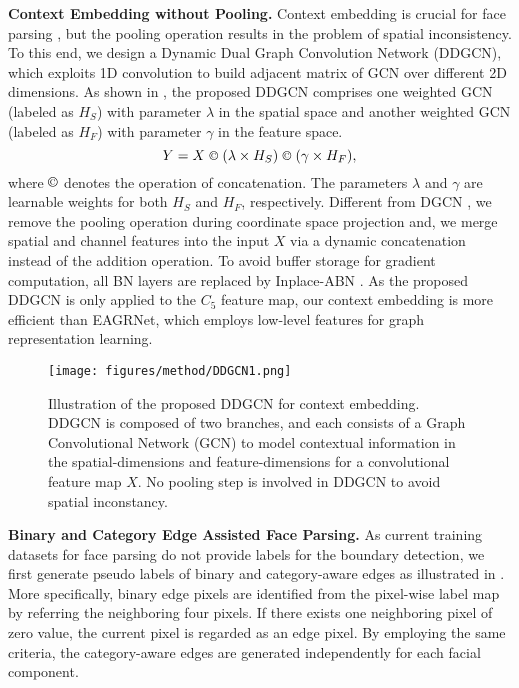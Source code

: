 \documentclass[10pt,twocolumn,letterpaper]{article}
\begin{document}
\noindent\textbf{Context Embedding without Pooling.} 
Context embedding is crucial for face parsing \cite{psp, NonLocal2018, dilatedConv1, YuKoltun2016}, but the pooling operation results in the problem of spatial inconsistency. To this end, we design a Dynamic Dual Graph Convolution Network (DDGCN), which exploits 1D convolution to build adjacent matrix of GCN over different 2D dimensions. As shown in \figureautorefname{ \ref{fig:ddgcn}}, the proposed DDGCN comprises one weighted GCN (labeled as $H_{S}$) with parameter $\lambda$ in the spatial space and another weighted GCN (labeled as $H_{F}$) with parameter $\gamma$ in the feature space. 
\begin{equation}
\small
Y = X \ \copyright \ (\lambda \times H_{S}) \ \copyright \ (\gamma \times H_{F}),
\end{equation}
where $\copyright$ denotes the operation of concatenation. The parameters $\lambda$ and $\gamma$ are learnable weights for both $H_{S}$ and $H_{F}$, respectively. Different from DGCN \cite{zhangli_dgcn}, we remove the pooling operation during coordinate space projection and, we merge spatial and channel features into the input $X$ via a dynamic concatenation instead of the addition operation. To avoid buffer storage for gradient computation, all BN layers are replaced by Inplace-ABN \cite{inplace}. As the proposed DDGCN is only applied to the $C_5$ feature map, our context embedding is more efficient than EAGRNet, which employs low-level features for graph representation learning.
\begin{figure}
\centering
\texttt{[image: figures/method/DDGCN1.png]}
\vspace{-6mm}
\caption{Illustration of the proposed DDGCN for context embedding. DDGCN is composed of two branches, and each consists of a Graph Convolutional Network (GCN) to model contextual information in the spatial-dimensions and feature-dimensions for a convolutional feature map $X$. No pooling step is involved in DDGCN to avoid spatial inconstancy.}
\label{fig:ddgcn}
\vspace{-4mm}
\end{figure}

\noindent\textbf{Binary and Category Edge Assisted Face Parsing.} 
As current training datasets for face parsing do not provide labels for the boundary detection, we first generate pseudo labels of binary and category-aware edges as illustrated in \figureautorefname{ \ref{fig:edgegeneration}}. More specifically, binary edge pixels are identified from the pixel-wise label map by referring the neighboring four pixels. If there exists one neighboring pixel of zero value, the current pixel is regarded as an edge pixel. By employing the same criteria, the category-aware edges are generated independently for each facial component.
\end{document}
